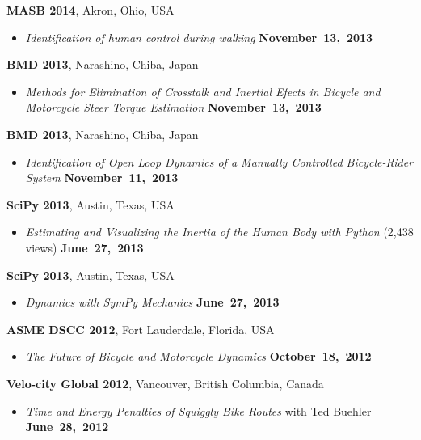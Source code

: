 \documentclass[10pt]{article}
\newenvironment{outerlist}[1][\enskip\textbullet]%
        {\begin{itemize}[#1]}{\end{itemize}%
         \vspace{-.6\baselineskip}}
\newcommand{\blankline}{\quad\pagebreak[2]}
\begin{document}
\blankline

\textbf{MASB 2014}, Akron, Ohio, USA
\begin{outerlist}
\item[] \textit{Identification of human control during walking}
    \hfill \textbf{November~13,~2013}
\end{outerlist}

\blankline

\textbf{BMD 2013}, Narashino, Chiba, Japan
\begin{outerlist}
  \item[] \textit{Methods for Elimination of Crosstalk and Inertial Efects in
    Bicycle and Motorcycle Steer Torque Estimation}
    \hfill \textbf{November~13,~2013}
\end{outerlist}

\blankline

\textbf{BMD 2013}, Narashino, Chiba, Japan
\begin{outerlist}
  \item[] \textit{Identification of Open Loop Dynamics of a Manually Controlled
    Bicycle-Rider System}
    \hfill \textbf{November~11,~2013}
\end{outerlist}

\blankline

\textbf{SciPy 2013}, Austin, Texas, USA
\begin{outerlist}
  \item[] \textit{Estimating and Visualizing the Inertia of the Human Body with
    Python} (2,438 views)
    \hfill \textbf{June~27,~2013}
\end{outerlist}

\blankline

\textbf{SciPy 2013}, Austin, Texas, USA
\begin{outerlist}
  \item[] \textit{Dynamics with SymPy Mechanics}
    \hfill \textbf{June~27,~2013}
\end{outerlist}

\blankline

\textbf{ASME DSCC 2012}, Fort Lauderdale, Florida, USA
\begin{outerlist}
  \item[] \textit{The Future of Bicycle and Motorcycle Dynamics}
    \hfill \textbf{October~18,~2012}
\end{outerlist}

\blankline

\textbf{Velo-city Global 2012}, Vancouver, British Columbia, Canada
\begin{outerlist}
  \item[] \textit{Time and Energy Penalties of Squiggly Bike Routes} with Ted
    Buehler
  \hfill \textbf{June~28,~2012}
\end{outerlist}
\end{document}

